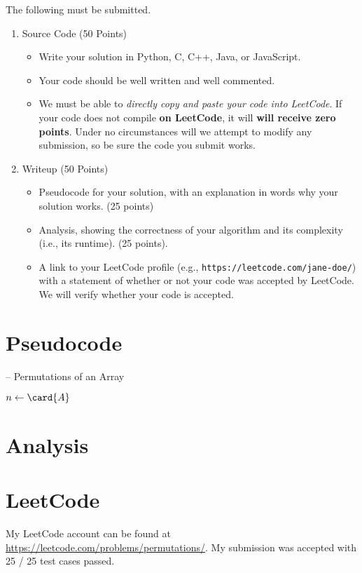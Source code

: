 \documentclass[draft]{article}
\begin{document}
\begin{titlepage}
    The following must be submitted.
    \begin{enumerate}[label=\textbf{(\alph*)}]
        \item Source Code (50 Points)
              \begin{itemize}
                  \item Write your solution in Python, C, C++, Java, or JavaScript.
                  \item Your code should be well written and well commented.
                  \item We must be able to \emph{directly copy and paste your code into LeetCode}. If your code does not compile \textbf{on LeetCode}, it will \textbf{will receive zero points}. Under no circumstances will we attempt to modify any submission, so be sure the code you submit works.
              \end{itemize}
        \item Writeup (50 Points)
              \begin{itemize}
                  \item Pseudocode for your solution, with an explanation in words why your solution works. (25 points)
                  \item Analysis, showing the correctness of your algorithm and its  complexity (i.e., its runtime). (25 points).
                  \item A link to your LeetCode profile (e.g., \texttt{https://leetcode.com/jane-doe/}) with a statement of whether or not your code was accepted by LeetCode. We will verify whether your code is accepted.
              \end{itemize}
    \end{enumerate}
\end{titlepage}

\section{Pseudocode}
\begin{algorithm}[H]
    \caption[]{ -- Permutations of an Array }
    \label{alg:permutations}
    \begin{algorithmic}[1]
        \State $n\gets\card{A}$
        \Else {}
        \EndIf
        \EndFunction
    \end{algorithmic}
\end{algorithm}
\section{Analysis}

\section{LeetCode}
My LeetCode account can be found at \url{https://leetcode.com/problems/permutations/}. My submission was accepted with 25 / 25 test cases passed.
\end{document}
